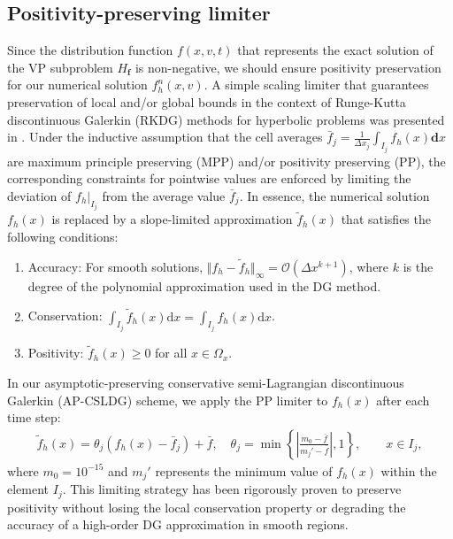 \documentclass[letterpaper,10pt]{article}
\numberwithin{equation}{section}
\numberwithin{figure}{section}
\numberwithin{table}{section}
\begin{document}

\subsection{Positivity-preserving limiter}
\hspace{4pt}
Since the distribution function $f(x,v,t)$ that represents the exact
solution of the VP subproblem $H_{\mathbf{f}}$ is non-negative, we should
ensure positivity preservation for our numerical solution $f_h^n(x,v)$. 
A simple scaling limiter that guarantees preservation of local and/or global
bounds in the context of Runge-Kutta discontinuous Galerkin (RKDG)
methods for hyperbolic problems was presented in \cite{PP-36,PP-37}.
Under the inductive assumption that the cell averages $\bar{f}_j=\frac{1}{\Delta x_j}\int_{I_j} f_h(x)\mathbf dx$ are maximum principle preserving (MPP)
and/or positivity preserving (PP), the corresponding constraints for
pointwise values are enforced by limiting the deviation of $f_h|_{I_j}$
from the average value
$\bar{f}_j$. In essence, the numerical solution $f_h(x)$ is
replaced by a slope-limited approximation  $\tilde{f}_h(x)$ that
satisfies the following conditions:
\begin{enumerate}
    \item Accuracy: For smooth solutions, $\Vert f_h-\tilde{f}_h\Vert_{\infty}=\mathcal{O}(\Delta x^{k+1})$, where $k$ is the degree of the polynomial approximation used in the DG method.
    \item Conservation: $\int_{I_j} \tilde{f}_h(x)\mathrm dx=\int_{I_j} f_h(x)\mathrm dx$.
    \item Positivity: $\tilde{f}_h(x)\geq 0$ for all $x\in \Omega_x$.
\end{enumerate}
In our asymptotic-preserving conservative semi-Lagrangian discontinuous Galerkin (AP-CSLDG) scheme, we apply the PP limiter to $f_h(x)$ after each time step:
\begin{align*}
    \tilde{f}_h(x)=\theta_j\left(f_h(x)-\bar{f}_j\right)+\bar{f},\quad \theta_j=\min\left\{\left\vert \frac{m_0-\bar{f}}{m_j'-\bar{f}}\right\vert,1\right\},
    \qquad x\in I_j,
\end{align*}
where $m_0=10^{-15}$ and $m_j'$ represents the minimum value of $f_h(x)$ within the element $I_j$. This limiting strategy has been rigorously proven to preserve positivity
\cite{PP-35,PP-37} without losing the local conservation property or degrading
the accuracy of a high-order DG approximation in smooth regions.
\end{document}

